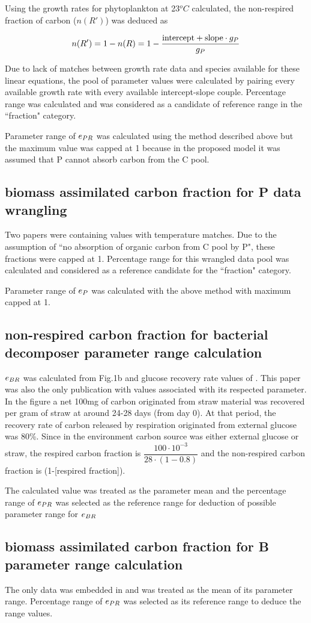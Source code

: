 \documentclass[../thesis.tex]{subfiles} %
\begin{document}
Using the growth rates for phytoplankton at 23$^oC$ calculated, the non-respired fraction of carbon ($n(R')$) was deduced as

\begin{equation}
    n(R') = 1-n(R) = 1-\dfrac{\text{intercept}+\text{slope}\cdot g_P}{g_P}
    \label{ePReqn}
\end{equation}

Due to lack of matches between growth rate data and species available for these linear equations, the pool of parameter values were calculated by pairing every available growth rate with every available intercept-slope couple.  Percentage range was calculated and was considered as a candidate of reference range in the ``fraction" category.

Parameter range of $e_{PR}$ was calculated using the method described above but the maximum value was capped at 1 because in the proposed model it was assumed that P cannot absorb carbon from the C pool.

\subsection{biomass assimilated carbon fraction for P data wrangling}
Two papers were containing values with temperature matches.  Due to the assumption of ``no absorption of organic carbon from C pool by P", these fractions were capped at 1.  Percentage range for this wrangled data pool was calculated and considered as a reference candidate for the ``fraction" category.

Parameter range of $e_P$ was calculated with the above method with maximum capped at 1.

\subsection{non-respired carbon fraction for bacterial decomposer parameter range calculation}
$e_{BR}$ was calculated from Fig.1b and glucose recovery rate values of \autocite{cochran1988estimation}.  This paper was also the only publication with values associated with its respected parameter.  In the figure a net 100mg of carbon originated from straw material was recovered per gram of straw at around 24-28 days (from day 0).  At that period, the recovery rate of carbon released by respiration originated from external glucose was 80\%.  Since in the environment carbon source was either external glucose or straw, the respired carbon fraction is $\dfrac{100\cdot10^{-3}}{28\cdot(1-0.8)}$ and the non-respired carbon fraction is (1-[respired fraction]).

The calculated value was treated as the parameter mean and the percentage range of $e_{PR}$ was selected as the reference range for deduction of possible parameter range for $e_{BR}$

\subsection{biomass assimilated carbon fraction for B parameter range calculation}
The only data was embedded in \autocite{cochran1988estimation} and was treated as the mean of its parameter range.  Percentage range of $e_{PR}$ was selected as its reference range to deduce the range values.
\end{document}
